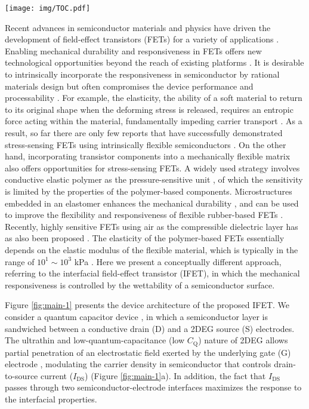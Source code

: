 \documentclass[journal=nalefd,manuscript=letter,email=true,hyperref=true,keywords=true]{achemso}
\begin{document}
\begin{tocentry}
  \vfill
  \texttt{[image: img/TOC.pdf]}
  \vfill
\end{tocentry}
\newpage{} Recent advances in semiconductor materials and physics have
driven the development of field-effect transistors (FETs) for a
variety of applications \cite{Torsi_2013_rev,Ben_Sasson_2014}.  Enabling
mechanical durability and responsiveness in FETs offers new
technological opportunities beyond the reach of existing platforms
\cite{Someya_2004,Oh_2016,Shin_2017}. It is desirable to intrinsically
incorporate the responsiveness in semiconductor by rational materials
design \cite{Oh_2016} but often compromises the device performance and
processability \cite{Lee_2018}. For example, the elasticity, the ability
of a soft material to return to its original shape when the deforming
stress is released, requires an entropic force acting within the
material, fundamentally impeding carrier transport
\cite{OConnor_2011_strain_P3HT}. As a result, so far there are only few
reports that have successfully demonstrated stress-sensing FETs using
intrinsically flexible semiconductors \cite{Oh_2016}. On the other hand,
incorporating transistor components into a mechanically flexible
matrix also offers opportunities for stress-sensing FETs. A widely
used strategy involves conductive elastic polymer as the
pressure-sensitive unit
\cite{Someya_2004,Sekitani_2009,Kaltenbrunner_2013,Takei_2010}, of which
the sensitivity is limited by the properties of the polymer-based
components. Microstructures embedded in an elastomer enhances the
mechanical durability \cite{Jang_2015}, and can be used to improve the
flexibility and responsiveness of flexible rubber-based FETs
\cite{Mannsfeld_2010,Schwartz_2013}. Recently, highly sensitive FETs
using air as the compressible dielectric layer has as also been
proposed \cite{Zang_2015,Shin_2017}. The elasticity of the polymer-based
FETs essentially depends on the elastic modulus of the flexible
material, which is typically in the range of \(10^{1}\sim{}10^{3}\) kPa
\cite{Amjadi_2016}. Here we present a conceptually
different approach, referring to the interfacial field-effect
transistor (IFET), in which the mechanical responsiveness is
controlled by the wettability of a semiconductor surface.

Figure \ref{fig:main-1} presents the device architecture of the proposed
IFET. We consider a quantum capacitor device \cite{Luryi_1988}, in which
a semiconductor layer is sandwiched between a conductive drain (D) and
a 2DEG source (S) electrodes. The ultrathin and
low-quantum-capacitance (low \(C_{\mathrm{Q}}\)) nature of 2DEG allows
partial penetration of an electrostatic field exerted by the
underlying gate (G) electrode \cite{Shih2015Partially,Tian_2016},
modulating the carrier density in semiconductor that controls
drain-to-source current (\(I_{\mathrm{DS}}\)) (Figure
\ref{fig:main-1}a).  In addition, the fact that \(I_{\mathrm{DS}}\)
passes through two semiconductor-electrode interfaces maximizes the
response to the interfacial properties.
\end{document}
